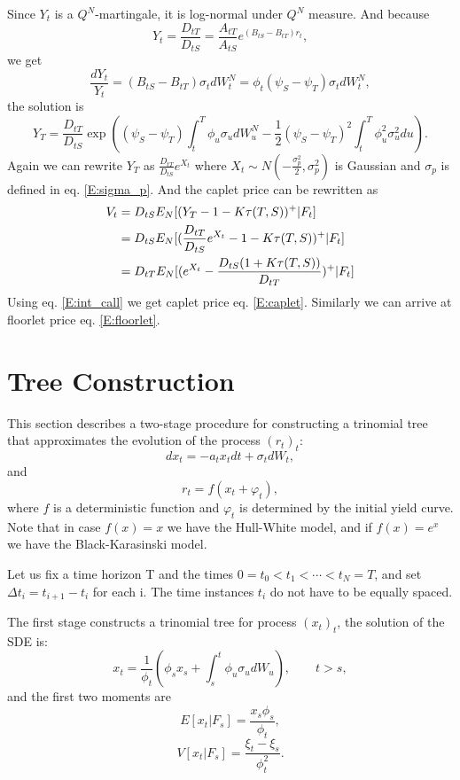 Since $Y_t$ is a $Q^N$-martingale, it is log-normal under $Q^N$ measure. And
because 
\[
  Y_t=\frac{D_{tT}}{D_{tS}}
     = \frac{A_{tT}}{A_{tS}} e^{(B_{tS}-B_{tT}) r_t},
\]
we get
\[
  \frac{dY_t}{Y_t} = (B_{tS}-B_{tT}) \sigma_t dW_t^N
    = \phi_t (\psi_S-\psi_T) \sigma_t dW_t^N,
\]
the solution is
\[
  Y_T = \frac{D_{tT}}{D_{tS}}
    \exp 
      \left(    
        (\psi_S-\psi_T) \int_t^T \phi_u \sigma_u dW_u^N
        -\frac{1}{2}(\psi_S-\psi_T)^2 \int_t^T \phi_u^2 \sigma_u^2 du
      \right).
\]
Again we can rewrite $Y_T$ as $\frac{D_{tT}}{D_{tS}}e^{X_t}$ where 
$X_t\sim N(-\frac{\sigma_p^2}{2},\sigma_p^2)$ is Gaussian and $\sigma_p$ is
defined in eq. \ref{E:sigma_p}. And the caplet price can be rewritten as
\begin{align*}
  V_t &= D_{tS} E_N[(Y_T-1-K\tau(T,S))^+|F_t] \notag \\
      &= D_{tS} E_N[(\frac{D_{tT}}{D_{tS}}e^{X_t}-1-K\tau(T,S))^+|F_t] \notag \\
      &= D_{tT} E_N[(e^{X_t}-\frac{D_{tS}(1+K\tau(T,S))}{D_{tT}})^+|F_t] 
         \notag \\
\end{align*}
Using eq. \ref{E:int_call} we get caplet price eq. \ref{E:caplet}. Similarly 
we can arrive at floorlet price eq. \ref{E:floorlet}.


\section{Tree Construction}
This section describes a two-stage procedure for constructing a trinomial 
tree that approximates the evolution of the process $(r_t)_t$:
\[
  d x_t = - a_t x_t dt + \sigma_t dW_t,
\]
and 
\[
  r_t = f(x_t + \varphi_t),
\]
where $f$ is a deterministic function and $\varphi_t$ is determined by the
initial yield curve. Note that in case $f(x)=x$ we have the Hull-White model,
and if $f(x)=e^x$ we have the Black-Karasinski model.

Let us fix a time horizon T and the times $0=t_0 < t_1 < \cdots < t_N=T$,
and set $\Delta t_i = t_{i+1} - t_i$ for each i. The time instances 
$t_i$ do not have to be equally spaced.

The first stage constructs a trinomial tree for process $(x_t)_t$,
the solution of the SDE is:
\[
  x_t = \frac{1}{\phi_t} 
        \left( \phi_s x_s + \int_s^t \phi_u \sigma_u dW_u \right) ,
        \qquad t>s,
\]
and the first two moments are
\[
  E[x_t | F_s] = \frac{x_s \phi_s}{ \phi_t },
\]
\[
  V[x_t | F_s] = \frac{\xi_t - \xi_s}{\phi_t^2}.
\]


